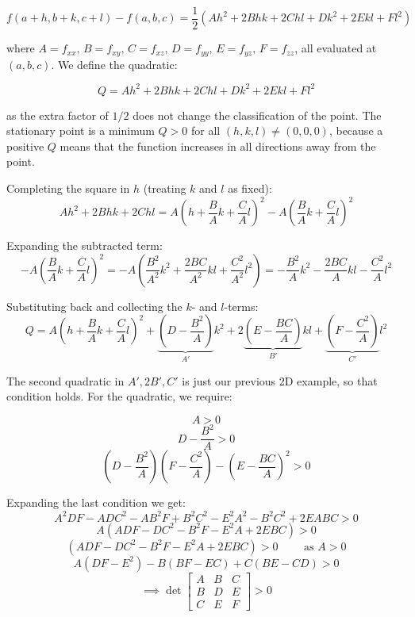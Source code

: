 \[
    f(a+h, b+k, c+l) - f(a,b,c) = \frac{1}{2}\left(Ah^2 + 2Bhk + 2Chl + Dk^2 + 2Ekl + Fl^2\right)
\]

where $A = f_{xx},\, B = f_{xy},\, C = f_{xz},\, D = f_{yy},\, E = f_{yz},\, 
F = f_{zz}$, all evaluated at $(a,b,c)$. We define the quadratic:

\[
    Q = Ah^2 + 2Bhk + 2Chl + Dk^2 + 2Ekl + Fl^2
\]

as the extra factor of $1/2$ does not change the classification of the point. The stationary point is a minimum $Q > 0$ for all $(h, k, l) \neq (0,0,0)$, because a positive $Q$ means that the function increases in all directions away from the point.

Completing the square in $h$ (treating $k$ and $l$ as fixed):
\[
    Ah^2 + 2Bhk + 2Chl = A\!\left(h + \frac{B}{A}k + \frac{C}{A}l\right)^{\!2} 
    - A\!\left(\frac{B}{A}k + \frac{C}{A}l\right)^{\!2}
\]

Expanding the subtracted term:
\[
    -A\!\left(\frac{B}{A}k + \frac{C}{A}l\right)^{\!2} 
    = -A\left(\frac{B^2}{A^2}k^2 + \frac{2BC}{A^2}kl + \frac{C^2}{A^2}l^2\right)
    = -\frac{B^2}{A}k^2 - \frac{2BC}{A}kl - \frac{C^2}{A}l^2
\]

Substituting back and collecting the $k$- and $l$-terms:
\[
    Q = A\!\left(h + \frac{B}{A}k + \frac{C}{A}l\right)^{\!2} 
    + \underbrace{\left(D - \frac{B^2}{A}\right)}_{A'}k^2 
    + 2\underbrace{\left(E - \frac{BC}{A}\right)}_{B'}kl 
    + \underbrace{\left(F - \frac{C^2}{A}\right)}_{C'}l^2
\]

The second quadratic in $A', 2B', C'$ is just our previous 2D example, so that condition holds. For the quadratic, we require:

\[
    A > 0
\]
\[
    D - \frac{B^2}{A} > 0
\]
\[
    \left(D - \frac{B^2}{A}\right) \left(F - \frac{C^2}{A}\right) - \left(E - \frac{BC}{A}\right)^2 > 0
\]

Expanding the last condition we get:
\[
    A^2 DF - ADC^2 - AB^2F + B^2C^2 - E^2 A^2 - B^2 C^2 + 2EABC > 0
\]
\[
    A \left(ADF - DC^2 - B^2 F - E^2 A + 2EBC\right) > 0
\]
\[
    \left(ADF - DC^2 - B^2 F - E^2 A + 2EBC\right) > 0 \qquad \text{ as } A > 0
\]
\[
    A(DF - E^2) - B(BF - EC) + C(BE - CD) > 0
\]
\[
    \implies \det \begin{bmatrix}
        A & B & C \\
        B & D & E \\
        C & E & F
    \end{bmatrix} > 0
\]

